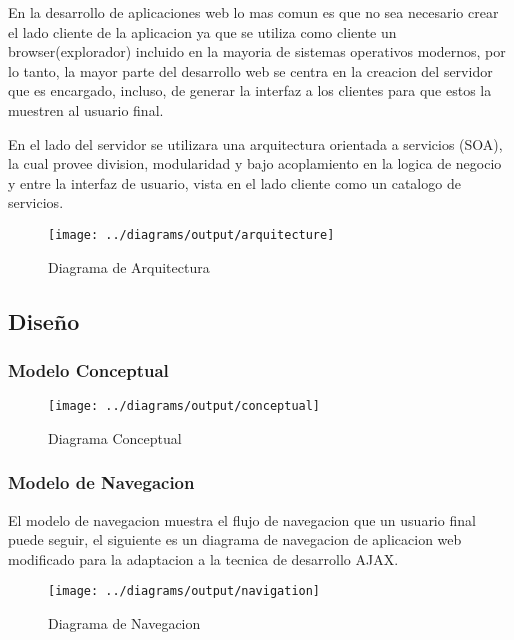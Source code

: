 En la desarrollo de aplicaciones web lo mas comun es que no sea necesario crear el lado cliente de la aplicacion ya que se utiliza como cliente un browser(explorador) incluido en la mayoria de sistemas operativos modernos, por lo tanto, la mayor parte del desarrollo web se centra en la creacion del servidor que es encargado, incluso, de generar la interfaz a los clientes para que estos la muestren al usuario final.

En el lado del servidor se utilizara una arquitectura orientada a servicios (SOA), la cual provee division, modularidad y bajo acoplamiento en la logica de negocio y entre la interfaz de usuario, vista en el lado cliente como un catalogo de servicios.

\newpage
\begin{landscape}
\begin{figure}
 \centering
 \texttt{[image: ../diagrams/output/arquitecture]}
 \caption{Diagrama de Arquitectura}
 \label{diagrama:arquitectura}
\end{figure}
\end{landscape}


\subsection{Diseño}

\subsubsection{Modelo Conceptual}

\begin{landscape}
\begin{figure}
 \centering
 \texttt{[image: ../diagrams/output/conceptual]}
 \caption{Diagrama Conceptual}
 \label{diagrama:conceptual}
\end{figure}
\end{landscape}


\subsubsection{Modelo de Navegacion}

El modelo de navegacion muestra el flujo de navegacion que un usuario final puede seguir, el siguiente es un diagrama de navegacion de aplicacion web modificado para la adaptacion a la tecnica de desarrollo AJAX.

\newpage

\begin{landscape}
\begin{figure}
 \centering
 \texttt{[image: ../diagrams/output/navigation]}
 \caption{Diagrama de Navegacion}
 \label{diagrama:navegacion}
\end{figure}
\end{landscape}


